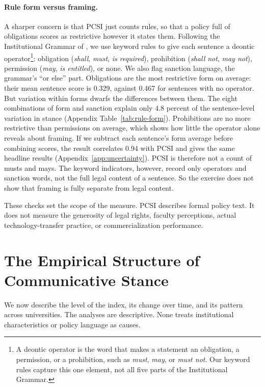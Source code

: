 \documentclass[11pt]{article}
\begin{document}
\paragraph{Rule form versus framing.} A sharper concern is that PCSI just counts rules, so that a policy full of obligations scores as restrictive however it states them. Following the Institutional Grammar of \citet{crawford1995grammar}, we use keyword rules to give each sentence a deontic operator\footnote{A deontic operator is the word that makes a statement an obligation, a permission, or a prohibition, such as \emph{must}, \emph{may}, or \emph{must not}. Our keyword rules capture this one element, not all five parts of the Institutional Grammar.}: obligation (\emph{shall}, \emph{must}, \emph{is required}), prohibition (\emph{shall not}, \emph{may not}), permission (\emph{may}, \emph{is entitled}), or none. We also flag sanction language, the grammar's ``or else'' part. Obligations are the most restrictive form on average: their mean sentence score is 0.329, against 0.467 for sentences with no operator. But variation within forms dwarfs the differences between them. The eight combinations of form and sanction explain only 4.8 percent of the sentence-level variation in stance (Appendix Table~\ref{tab:rule-form}). Prohibitions are no more restrictive than permissions on average, which shows how little the operator alone reveals about framing. If we subtract each sentence's form average before combining scores, the result correlates 0.94 with PCSI and gives the same headline results (Appendix~\ref{app:uncertainty}). PCSI is therefore not a count of musts and mays. The keyword indicators, however, record only operators and sanction words, not the full legal content of a sentence. So the exercise does not show that framing is fully separate from legal content.

These checks set the scope of the measure. PCSI describes formal policy text. It does not measure the generosity of legal rights, faculty perceptions, actual technology-transfer practice, or commercialization performance.

\section{The Empirical Structure of Communicative Stance}\label{sec:results}

We now describe the level of the index, its change over time, and its pattern across universities. The analyses are descriptive. None treats institutional characteristics or policy language as causes.
\end{document}
